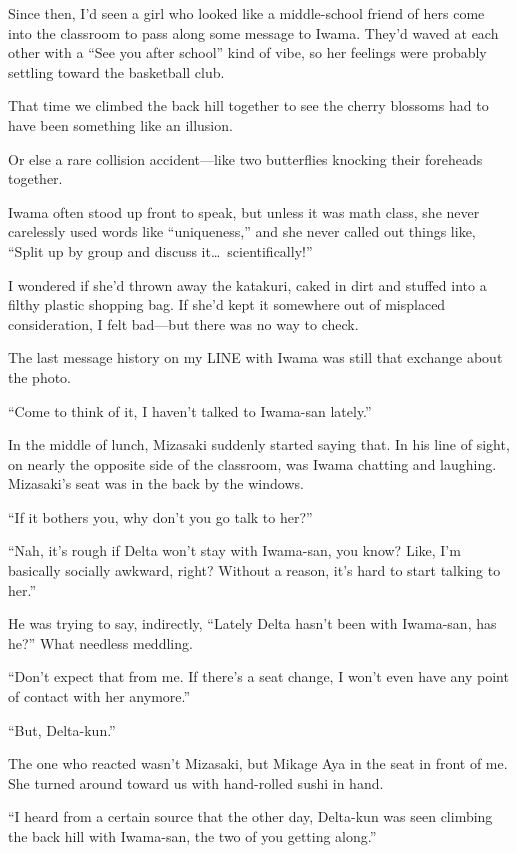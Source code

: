 \documentclass[
    a4paper,
    12pt,
    twoside,
    openany,
    UTF8,
    fontset=windows
]{ctexbook}
\begin{document}
Since then, I'd seen a girl who looked like a middle-school friend of hers come into the classroom to pass along some message to Iwama. They'd waved at each other with a ``See you after school'' kind of vibe, so her feelings were probably settling toward the basketball club.

That time we climbed the back hill together to see the cherry blossoms had to have been something like an illusion.

Or else a rare collision accident---like two butterflies knocking their foreheads together.

Iwama often stood up front to speak, but unless it was math class, she never carelessly used words like ``uniqueness,'' and she never called out things like, ``Split up by group and discuss it\dots\ scientifically!''

I wondered if she'd thrown away the katakuri, caked in dirt and stuffed into a filthy plastic shopping bag. If she'd kept it somewhere out of misplaced consideration, I felt bad---but there was no way to check.

The last message history on my LINE with Iwama was still that exchange about the photo.

``Come to think of it, I haven't talked to Iwama-san lately.''

In the middle of lunch, Mizasaki suddenly started saying that. In his line of sight, on nearly the opposite side of the classroom, was Iwama chatting and laughing. Mizasaki's seat was in the back by the windows.

``If it bothers you, why don't you go talk to her?''

``Nah, it's rough if Delta won't stay with Iwama-san, you know? Like, I'm basically socially awkward, right? Without a reason, it's hard to start talking to her.''

He was trying to say, indirectly, ``Lately Delta hasn't been with Iwama-san, has he?'' What needless meddling.

``Don't expect that from me. If there's a seat change, I won't even have any point of contact with her anymore.''

``But, Delta-kun.''

The one who reacted wasn't Mizasaki, but Mikage Aya in the seat in front of me. She turned around toward us with hand-rolled sushi in hand.

``I heard from a certain source that the other day, Delta-kun was seen climbing the back hill with Iwama-san, the two of you getting along.''
\end{document}
